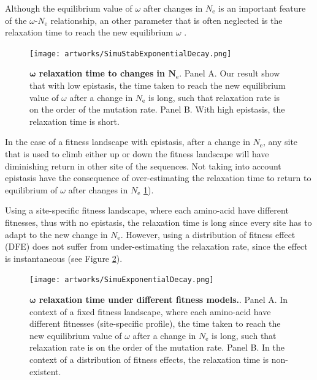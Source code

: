 \documentclass{article}
\newcommand{\Ne}{N_{\mathrm{e}}}
\newcommand{\dnds}{\omega}
\begin{document}
Although the equilibrium value of $\dnds$ after changes in $\Ne$ is an important feature of the $\dnds$-$\Ne$ relationship, an other parameter that is often neglected is the relaxation time to reach the new equilibrium $\dnds$ \cite{Jones2016}.
\begin{figure}[htb!]
\begin{mdframed}
	\centering
	\texttt{[image: artworks/SimuStabExponentialDecay.png]}
	\vspace*{0.2em}
	\caption{
		\textbf{$\bm{\dnds}$ relaxation time to changes in $\bm{\Ne}$}.
		Panel A. Our result show that with low epistasis, the time taken to reach the new equilibrium value of $\dnds$ after a change in $\Ne$ is long, such that relaxation rate is on the order of the mutation rate.
		Panel B. With high epistasis, the relaxation time is short.
	}
	\label{fig:relaxStability}
\end{mdframed}
\end{figure}
In the case of a fitness landscape with epistasis, after a change in $\Ne$, any site that is used to climb either up or down the fitness landscape will have diminishing return in other site of the sequences.
Not taking into account epistasis have the consequence of over-estimating the relaxation time to return to equilibrium of $\dnds$ after changes in $\Ne$ \ref{fig:relaxStability}).

Using a site-specific fitness landscape, where each amino-acid have different fitnesses, thus with no epistasis, the relaxation time is long since every site has to adapt to the new change in $\Ne$.
However, using a distribution of fitness effect (DFE) does not suffer from under-estimating the relaxation rate, since the effect is instantaneous (see Figure \ref{fig:relaxProfileDFE}).

\begin{figure}[htb!]
\begin{mdframed}
	\centering
	\texttt{[image: artworks/SimuExponentialDecay.png]}
	\vspace*{0.2em}
	\caption{
		\textbf{$\bm{\dnds}$ relaxation time under different fitness models.}.
		Panel A. In context of a fixed fitness landscape, where each amino-acid have different fitnesses (site-specific profile), the time taken to reach the new equilibrium value of $\dnds$ after a change in $\Ne$ is long, such that relaxation rate is on the order of the mutation rate.
		Panel B. In the context of a distribution of fitness effects, the relaxation time is non-existent.
	}
	\label{fig:relaxProfileDFE}
\end{mdframed}
\end{figure}
\end{document}

